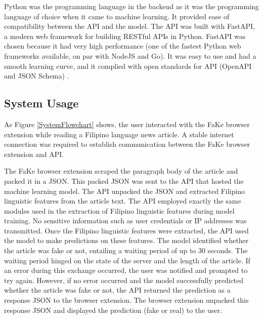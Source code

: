 Python was the programming language in the backend as it was the programming language of choice when it came to machine learning. It provided ease of compatibility between the API and the model. The API was built with FastAPI, a modern web framework for building RESTful APIs in Python. FastAPI was chosen because it had very high performance (one of the fastest Python web frameworks available, on par with NodeJS and Go). It was easy to use and had a smooth learning curve, and it complied with open standards for API (OpenAPI and JSON Schema) \cite{fastapi-website}.

\subsection{System Usage}

As Figure \ref{SystemFlowchart} shows, the user interacted with the FaKe browser extension while reading a Filipino language news article. A stable internet connection was required to establish communication between the FaKe browser extension and API.

The FaKe browser extension scraped the paragraph body of the article and packed it in a JSON. This packed JSON was sent to the API that hosted the machine learning model. The API unpacked the JSON and extracted Filipino linguistic features from the article text. The API employed exactly the same modules used in the extraction of Filipino linguistic features during model training. No sensitive information such as user credentials or IP addresses was transmitted. Once the Filipino linguistic features were extracted, the API used the model to make predictions on these features. The model identified whether the article was fake or not, entailing a waiting period of up to 30 seconds. The waiting period hinged on the state of the server and the length of the article. If an error during this exchange occurred, the user was notified and prompted to try again. However, if no error occurred and the model successfully predicted whether the article was fake or not, the API returned the prediction as a response JSON to the browser extension. The browser extension unpacked this response JSON and displayed the prediction (fake or real) to the user.

